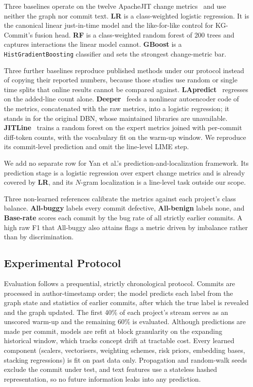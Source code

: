 \documentclass[final,5p,times,twocolumn]{elsarticle}
\theoremstyle{plain}
\begin{document}
Three baselines operate on the twelve ApacheJIT change metrics~\cite{keshavarz2022apachejit} and use neither the graph nor commit text. \textbf{LR} is a class-weighted logistic regression. It is the canonical linear just-in-time model and the like-for-like control for KG-Commit's fusion head. \textbf{RF} is a class-weighted random forest of 200 trees and captures interactions the linear model cannot. \textbf{GBoost} is a \texttt{HistGradientBoosting} classifier and sets the strongest change-metric bar.

Three further baselines reproduce published methods under our protocol instead of copying their reported numbers, because those studies use random or single time splits that online results cannot be compared against. \textbf{LApredict}~\cite{zeng2021deep} regresses on the added-line count alone. \textbf{Deeper}~\cite{yang2015deep} feeds a nonlinear autoencoder code of the metrics, concatenated with the raw metrics, into a logistic regression; it stands in for the original DBN, whose maintained libraries are unavailable. \textbf{JITLine}~\cite{pornprasit2021jitline} trains a random forest on the expert metrics joined with per-commit diff-token counts, with the vocabulary fit on the warm-up window. We reproduce its commit-level prediction and omit the line-level LIME step.

We add no separate row for Yan et al.'s prediction-and-localization framework. Its prediction stage is a logistic regression over expert change metrics and is already covered by \textbf{LR}, and its $N$-gram localization is a line-level task outside our scope.

Three non-learned references calibrate the metrics against each project's class balance. \textbf{All-buggy} labels every commit defective, \textbf{All-benign} labels none, and \textbf{Base-rate} scores each commit by the bug rate of all strictly earlier commits. A high raw F1 that All-buggy also attains flags a metric driven by imbalance rather than by discrimination.

\subsection{Experimental Protocol}
\label{sec:setup-protocol-section}

Evaluation follows a prequential, strictly chronological protocol. Commits are processed in author-timestamp order; the model predicts each label from the graph state and statistics of earlier commits, after which the true label is revealed and the graph updated. The first 40\% of each project's stream serves as an unscored warm-up and the remaining 60\% is evaluated. Although predictions are made per commit, models are refit at block granularity on the expanding historical window, which tracks concept drift at tractable cost. Every learned component (scalers, vectorisers, weighting schemes, risk priors, embedding bases, stacking regressions) is fit on past data only. Propagation and random-walk seeds exclude the commit under test, and text features use a stateless hashed representation, so no future information leaks into any prediction.
\end{document}
